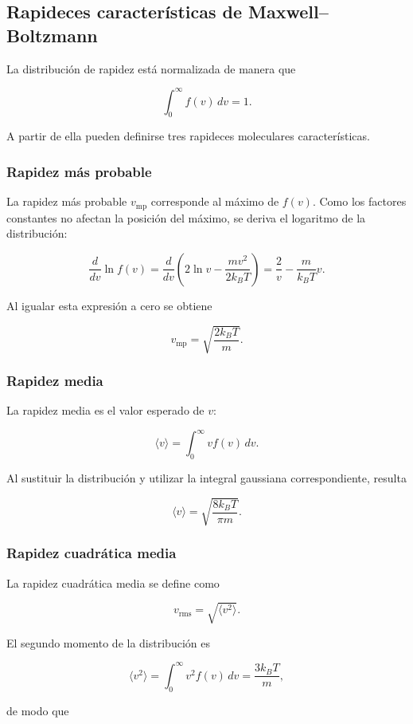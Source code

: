 \subsection{Rapideces características de Maxwell--Boltzmann}

La distribución de rapidez está normalizada de manera que

$$
\int_0^{\infty}f(v)\,dv=1.
$$

A partir de ella pueden definirse tres rapideces moleculares características.

\subsubsection{Rapidez más probable}

La rapidez más probable $v_{\mathrm{mp}}$ corresponde al máximo de $f(v)$.
Como los factores constantes no afectan la posición del máximo, se deriva el
logaritmo de la distribución:

$$
\frac{d}{dv}\ln f(v)
=\frac{d}{dv}\left(2\ln v-\frac{mv^2}{2k_BT}\right)
=\frac{2}{v}-\frac{m}{k_BT}v.
$$

Al igualar esta expresión a cero se obtiene

$$
\boxed{
v_{\mathrm{mp}}=\sqrt{\frac{2k_BT}{m}}
}.
$$

\subsubsection{Rapidez media}

La rapidez media es el valor esperado de $v$:

$$
\langle v\rangle
=\int_0^{\infty}v f(v)\,dv.
$$

Al sustituir la distribución y utilizar la integral gaussiana correspondiente,
resulta

$$
\boxed{
\langle v\rangle
=\sqrt{\frac{8k_BT}{\pi m}}
}.
$$

\subsubsection{Rapidez cuadrática media}

La rapidez cuadrática media se define como

$$
v_{\mathrm{rms}}=\sqrt{\langle v^2\rangle}.
$$

El segundo momento de la distribución es

$$
\langle v^2\rangle
=\int_0^{\infty}v^2f(v)\,dv
=\frac{3k_BT}{m},
$$

de modo que

